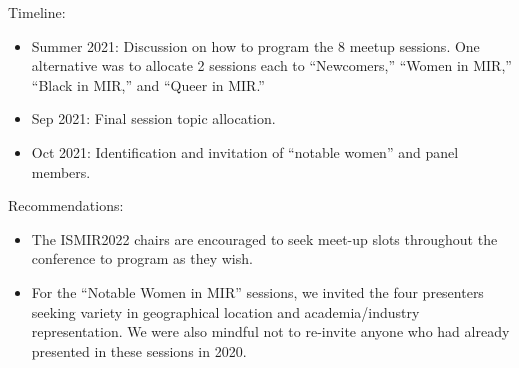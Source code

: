 \documentclass[%
10pt,								%
titlepage,						%
]
{scrartcl}
\begin{document}
                Timeline:
                \begin{itemize}
                    \item   Summer 2021: Discussion on how to program the 8 meetup sessions. One alternative was to allocate 2 sessions each to ``Newcomers,'' ``Women in MIR,'' ``Black in MIR,'' and ``Queer in MIR.''
                    \item   Sep 2021: Final session topic allocation.
                    \item   Oct 2021: Identification and invitation of ``notable women'' and panel members.
                \end{itemize}

                Recommendations:
                \begin{itemize}
                    \item   The ISMIR2022 chairs are encouraged to seek meet-up slots throughout the conference to program as they wish.
                    \item   For the ``Notable Women in MIR'' sessions, we invited the four presenters seeking variety in geographical location and academia/industry representation. We were also mindful not to re-invite anyone who had already presented in these sessions in 2020.
                \end{itemize}
\end{document}
